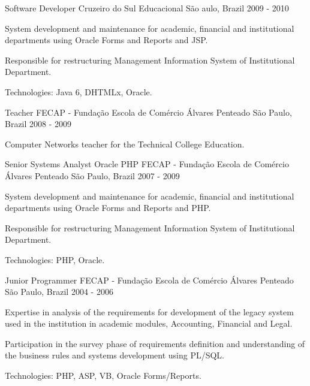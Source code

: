 \begin{cventries}
  \cventry
    {Software Developer} %
    {Cruzeiro do Sul Educacional} %
    {São aulo, Brazil} %
    {2009 - 2010} %
    {
      \begin{cvitems} %
        \item {System development and maintenance for academic, financial and institutional departments using Oracle Forms and Reports and JSP.}
        \item {Responsible for restructuring Management Information System of Institutional Department.}
        \item {Technologies: Java 6, DHTMLx, Oracle.}
      \end{cvitems}
    }

  \cventry
    {Teacher} %
    {FECAP - Fundação Escola de Comércio Álvares Penteado} %
    {São Paulo, Brazil} %
    {2008 - 2009} %
    {
      \begin{cvitems} %
        \item {Computer Networks teacher for the Technical College Education.}
      \end{cvitems}
    }

  \cventry
    {Senior Systems Analyst Oracle PHP} %
    {FECAP - Fundação Escola de Comércio Álvares Penteado} %
    {São Paulo, Brazil} %
    {2007 - 2009} %
    {
      \begin{cvitems} %
        \item {System development and maintenance for academic, financial and institutional departments using Oracle Forms and Reports and PHP.}
        \item {Responsible for restructuring Management Information System of Institutional Department.}
        \item {Technologies: PHP, Oracle.}
      \end{cvitems}
    }

  \cventry
    {Junior Programmer} %
    {FECAP - Fundação Escola de Comércio Álvares Penteado} %
    {São Paulo, Brazil} %
    {2004 - 2006} %
    {
      \begin{cvitems} %
        \item {Expertise in analysis of the requirements for development of the legacy system used in the institution in academic modules, Accounting, Financial and Legal.}
        \item {Participation in the survey phase of requirements definition and understanding of the business rules and systems development using PL/SQL.}
        \item {Technologies: PHP, ASP, VB, Oracle Forms/Reports.}
      \end{cvitems}
    }


\end{cventries}

